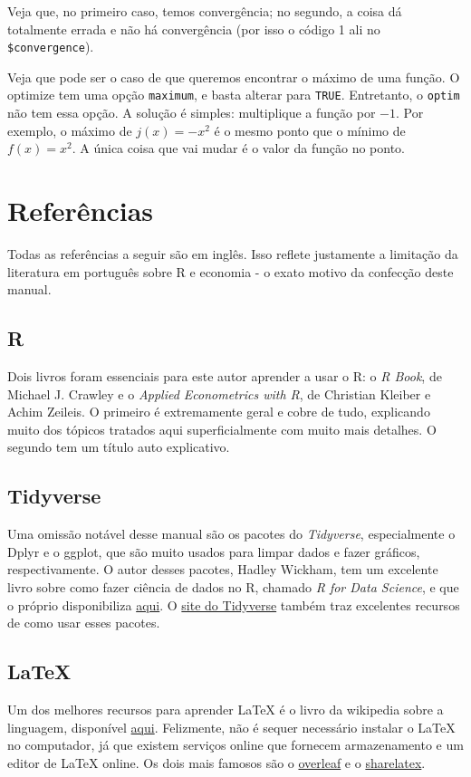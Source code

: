 \documentclass[]{book}
\begin{document}
Veja que, no primeiro caso, temos convergência; no segundo, a coisa dá
totalmente errada e não há convergência (por isso o código 1 ali no
\texttt{\$convergence}).

Veja que pode ser o caso de que queremos encontrar o máximo de uma
função. O optimize tem uma opção \texttt{maximum}, e basta alterar para
\texttt{TRUE}. Entretanto, o \texttt{optim} não tem essa opção. A
solução é simples: multiplique a função por \(-1\). Por exemplo, o
máximo de \(j(x)=- x^2\) é o mesmo ponto que o mínimo de \(f(x)=x^2\). A
única coisa que vai mudar é o valor da função no ponto.

\chapter{Referências}\label{referencias}

Todas as referências a seguir são em inglês. Isso reflete justamente a
limitação da literatura em português sobre R e economia - o exato motivo
da confecção deste manual.

\section{R}\label{r}

Dois livros foram essenciais para este autor aprender a usar o R: o
\emph{R Book}, de Michael J. Crawley e o \emph{Applied Econometrics with
R}, de Christian Kleiber e Achim Zeileis. O primeiro é extremamente
geral e cobre de tudo, explicando muito dos tópicos tratados aqui
superficialmente com muito mais detalhes. O segundo tem um título auto
explicativo.

\section{Tidyverse}\label{tidyverse}

Uma omissão notável desse manual são os pacotes do \emph{Tidyverse},
especialmente o Dplyr e o ggplot, que são muito usados para limpar dados
e fazer gráficos, respectivamente. O autor desses pacotes, Hadley
Wickham, tem um excelente livro sobre como fazer ciência de dados no R,
chamado \emph{R for Data Science}, e que o próprio disponibiliza
\href{http://r4ds.had.co.nz/}{aqui}. O
\href{https://www.tidyverse.org/}{site do Tidyverse} também traz
excelentes recursos de como usar esses pacotes.

\section{LaTeX}\label{latex}

Um dos melhores recursos para aprender LaTeX é o livro da wikipedia
sobre a linguagem, disponível
\href{https://en.wikibooks.org/wiki/LaTeX}{aqui}. Felizmente, não é
sequer necessário instalar o LaTeX no computador, já que existem
serviços online que fornecem armazenamento e um editor de LaTeX online.
Os dois mais famosos são o \href{https://www.overleaf.com/}{overleaf} e
o \href{https://pt.sharelatex.com/}{sharelatex}.
\end{document}
